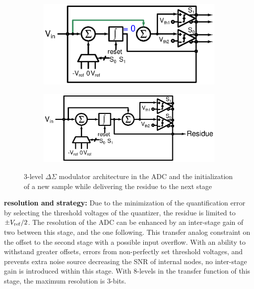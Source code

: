 \begin{figure}[htp]
	\centering
	\begin{subfigure}[b]{0.48\textwidth}
		\centering
		\includegraphics[width=\textwidth]{Chapter4/Figs/isd-principle-reset.ps}
		\label{fig:isd-alone-reset-clk-cycle}
	\end{subfigure}
	\begin{subfigure}[b]{0.48\textwidth}
		\centering
		\includegraphics[width=\textwidth]{Chapter4/Figs/isd-principle.ps}
		\label{fig:isd-alone-std-clk-cycle}
	\end{subfigure}
	\caption{3-level \(\Delta\Sigma \) modulator architecture in the ADC and the initialization of a new sample while delivering the
	residue to the next stage}
	\label{fig:isd-alone-clk-cycle}
\end{figure}

\textbf{\textcolor{black}{resolution and strategy:}}
Due to the minimization of the quantification error by selecting the threshold voltages of the quantizer, the residue is limited to $\pm V_{\rm ref}/2$. The resolution of the ADC can be enhanced by an inter-stage gain of two between this stage, and the one following. This transfer analog constraint on the offset to the second stage with a possible input overflow. With an ability to withstand greater offsets, errors from non-perfectly set threshold voltages, and prevents extra noise source decreasing the SNR of internal nodes, no inter-stage gain is introduced within this stage. With 8-levels in the transfer function of this stage, the maximum resolution is 3-bits.

